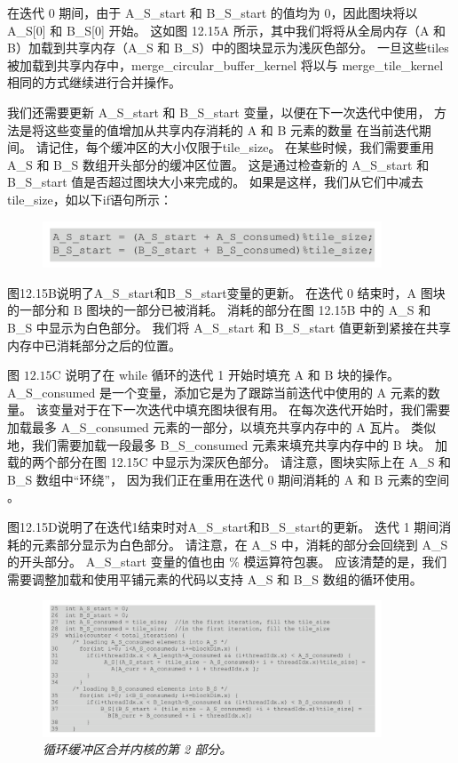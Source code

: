 在迭代 0 期间，由于 A\_S\_start 和 B\_S\_start 的值均为 0，因此图块将以 A\_S[0] 和 B\_S[0] 开始。 
这如图 12.15A 所示，其中我们将将从全局内存（A 和 B）加载到共享内存（A\_S 和 B\_S）中的图块显示为浅灰色部分。 
一旦这些tiles被加载到共享内存中，merge\_circular\_buffer\_kernel 
将以与 merge\_tile\_kernel 相同的方式继续进行合并操作。

我们还需要更新 A\_S\_start 和 B\_S\_start 变量，以便在下一次迭代中使用，
方法是将这些变量的值增加从共享内存消耗的 $\mathrm{A}$ 和 B 元素的数量 在当前迭代期间。 
请记住，每个缓冲区的大小仅限于tile\_size。 在某些时候，我们需要重用 A\_S 和 B\_S 数组开头部分的缓冲区位置。 
这是通过检查新的 A\_S\_start 和 B\_S\_start 值是否超过图块大小来完成的。 
如果是这样，我们从它们中减去tile\_size，如以下if语句所示：

\begin{figure}[H]
	\centering
	\includegraphics[width=0.9\textwidth]{figs/F12-a3.png}
\end{figure}

图12.15B说明了A\_S\_start和B\_S\_start变量的更新。 
在迭代 0 结束时，$\mathrm{A}$ 图块的一部分和 $\mathrm{B}$ 图块的一部分已被消耗。 
消耗的部分在图 12.15B 中的 A\_S 和 B\_S 中显示为白色部分。 
我们将 A\_S\_start 和 B\_S\_start 值更新到紧接在共享内存中已消耗部分之后的位置。

图 $12.15 \mathrm{C}$ 说明了在 while 循环的迭代 1 开始时填充 $\mathrm{A}$ 和 $\mathrm{B}$ 块的操作。 
A\_S\_consumed 是一个变量，添加它是为了跟踪当前迭代中使用的 $\mathrm{A}$ 元素的数量。 
该变量对于在下一次迭代中填充图块很有用。 
在每次迭代开始时，我们需要加载最多 A\_S\_consumed 元素的一部分，以填充共享内存中的 A 瓦片。 
类似地，我们需要加载一段最多 B\_S\_consumed 元素来填充共享内存中的 B 块。 
加载的两个部分在图 12.15C 中显示为深灰色部分。 
请注意，图块实际上在 A\_S 和 B\_S 数组中“环绕”，
因为我们正在重用在迭代 0 期间消耗的 $\mathrm{A}$ 和 $\mathrm{B}$ 元素的空间 。

图12.15D说明了在迭代1结束时对A\_S\_start和B\_S\_start的更新。 迭代 1 期间消耗的元素部分显示为白色部分。 
请注意，在 A\_S 中，消耗的部分会回绕到 A\_S 的开头部分。 A\_S\_start 变量的值也由 \% 模运算符包裹。 
应该清楚的是，我们需要调整加载和使用平铺元素的代码以支持 A\_S 和 B\_S 数组的循环使用。

\begin{figure}[H]
	\centering
	\includegraphics[width=0.9\textwidth]{figs/F12.16.png}
	\caption{\textit{循环缓冲区合并内核的第 2 部分。}}
\end{figure}

